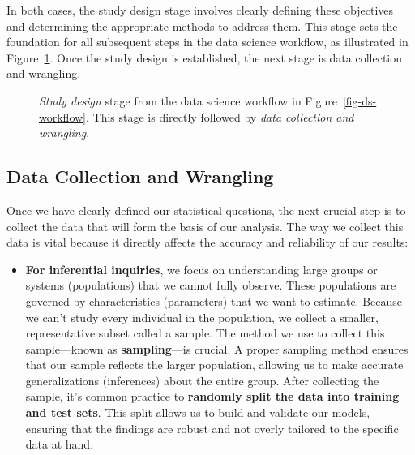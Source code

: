 \documentclass[
  letterpaper,
  DIV=11,
  numbers=noendperiod]{scrreprt}
\providecommand{\tightlist}{%
  \setlength{\itemsep}{0pt}\setlength{\parskip}{0pt}}\usepackage{longtable,booktabs,array}
\begin{document}
In both cases, the study design stage involves clearly defining these
objectives and determining the appropriate methods to address them. This
stage sets the foundation for all subsequent steps in the data science
workflow, as illustrated in Figure~\ref{fig-ds-workflow-study-design}.
Once the study design is established, the next stage is data collection
and wrangling.

\begin{figure}


\caption{\label{fig-ds-workflow-study-design}\emph{Study design} stage
from the data science workflow in Figure~\ref{fig-ds-workflow}. This
stage is directly followed by \emph{data collection and wrangling}.}

\end{figure}%

\subsection{Data Collection and
Wrangling}\label{sec-ds-workflow-data-collection}

Once we have clearly defined our statistical questions, the next crucial
step is to collect the data that will form the basis of our analysis.
The way we collect this data is vital because it directly affects the
accuracy and reliability of our results:

\begin{itemize}
\tightlist
\item
  \textbf{For inferential inquiries}, we focus on understanding large
  groups or systems (populations) that we cannot fully observe. These
  populations are governed by characteristics (parameters) that we want
  to estimate. Because we can't study every individual in the
  population, we collect a smaller, representative subset called a
  sample. The method we use to collect this sample---known as
  \textbf{sampling}---is crucial. A proper sampling method ensures that
  our sample reflects the larger population, allowing us to make
  accurate generalizations (inferences) about the entire group. After
  collecting the sample, it's common practice to \textbf{randomly split
  the data into training and test sets}. This split allows us to build
  and validate our models, ensuring that the findings are robust and not
  overly tailored to the specific data at hand.
\end{itemize}
\end{document}
